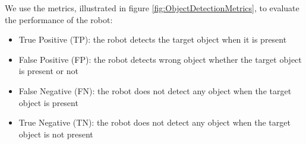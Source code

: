 We use the metrics, illustrated in figure \ref{fig:ObjectDetectionMetrics}, to evaluate the performance of the robot:
\begin{itemize}
	\item True Positive (TP): the robot detects the target object when it is present
	\item False Positive (FP): the robot detects wrong object whether the target object is present or not
	\item False Negative (FN): the robot does not detect any object when the target object is present
	\item True Negative (TN): the robot does not detect any object when the target object is not present
\end{itemize} 
\begin{figure}[h!]
	\centering
\end{figure}
